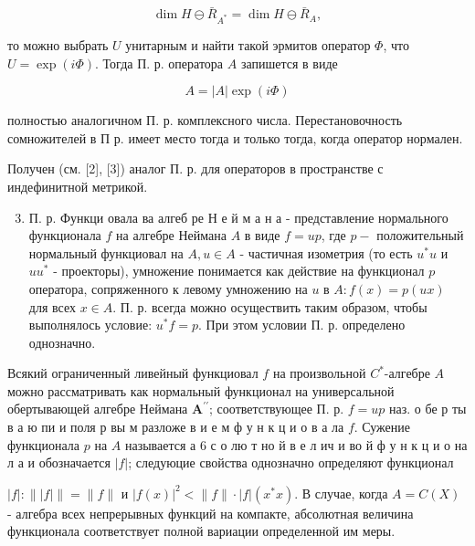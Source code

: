 \documentclass[10pt]{article}
\begin{document}
\[

\operatorname{dim} H \ominus \bar{R}_{A^{*}}=\operatorname{dim} H \ominus \bar{R}_{A},

\]



то можно выбрать $U$ унитарным и найти такой эрмитов оператор $\Phi$, что $U=\exp (i \Phi)$. Тогда П. р. оператора $A$ запишется в виде



\[

A=|A| \exp (i \Phi)

\]



полностью аналогичном П. р. комплексного числа. Перестановочность сомножителей в П р. имеет место тогда и только тогда, когда оператор нормален.



Получен (см. [2], [3]) аналог П. р. для операторов в пространстве с индефинитной метрикой.



\begin{enumerate}

  \setcounter{enumi}{2}

  \item П. р. Функци овала ва алгеб ре Н е й м а н а - представление нормального функционала $f$ на алгебре Неймана $A$ в виде $f=u p$, где $p-$ положительный нормальный функциовал на $A, u \in A$ - частичная изометрия (то есть $u^{*} u$ и $u u^{*}$ - проекторы), умножение понимается как действие на функционал $p$ оператора, сопряженного к левому умножению на $u$ в $A: f(x)=p(u x)$ для всех $x \in A$. П. р. всегда можно осуществить таким образом, чтобы выполнялось условие: $u^{*} f=p$. При этом условии П. р. определено однозначно.

\end{enumerate}



Всякий ограниченный ливейный функциовал $f$ на произвольной $C^{*}$-алгебре $A$ можно рассматривать как нормальный функционал на универсальной обертывающей алгебре Неймана $\boldsymbol{A}^{\prime \prime}$; соответствующее П. р. $f=u p$ наз. о бе р ты в а ю пи и поля р вы м разложе в и е м ф у н к ц и о в а ла $f$. Сужение функционала $p$ на $A$ называется а 6 с о лю т но й в е л ич и во й ф у н к ц и о на л а и обозначается $|f|$; следуюцие свойства однозначно определяют функционал



$|f|:\||f|\|=\|f\|$ и $|f(x)|^{2}<\|f\| \cdot|f|\left(x^{*} x\right)$. В случае, когда $A=C(X)$ - алгебра всех непрерывных функций на компакте, абсолютная величина функционала соответствует полной вариации определенной им меры.
\end{document}
